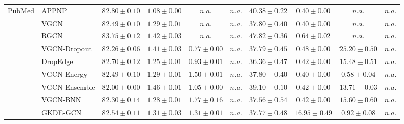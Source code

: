 \begin{table*}[!h]
{\begin{tabular}{ll|cccc|cccc}
        \multirow{10}{*}{PubMed}
        & APPNP & ${82.80\scriptscriptstyle \pm 0.10}$ & ${1.08\scriptscriptstyle \pm 0.00}$ & $n.a.$ & $n.a.$ & ${40.38\scriptscriptstyle \pm 0.22}$ & ${0.40\scriptscriptstyle \pm 0.00}$ & $n.a.$ & $n.a.$\\
        & VGCN & ${82.49\scriptscriptstyle \pm 0.10}$ & ${1.29\scriptscriptstyle \pm 0.01}$ & $n.a.$ & $n.a.$ & ${37.80\scriptscriptstyle \pm 0.40}$ & ${0.40\scriptscriptstyle \pm 0.00}$ & $n.a.$ & $n.a.$\\
        & RGCN & ${\mathbf{83.75}\scriptscriptstyle \pm 0.12}$ & ${1.42\scriptscriptstyle \pm 0.03}$ & $n.a.$ & $n.a.$ & ${47.82\scriptscriptstyle \pm 0.36}$ & ${0.64\scriptscriptstyle \pm 0.02}$ & $n.a.$ & $n.a.$\\
        & VGCN-Dropout & ${82.26\scriptscriptstyle \pm 0.06}$ & ${1.41\scriptscriptstyle \pm 0.03}$ & ${0.77\scriptscriptstyle \pm 0.00}$ & $n.a.$ & ${37.79\scriptscriptstyle \pm 0.45}$ & ${0.48\scriptscriptstyle \pm 0.00}$ & ${25.20\scriptscriptstyle \pm 0.50}$ & $n.a.$\\
        & DropEdge & ${82.70\scriptscriptstyle \pm 0.12}$ & ${1.25\scriptscriptstyle \pm 0.01}$ & ${0.93\scriptscriptstyle \pm 0.01}$ & $n.a.$ & ${36.36\scriptscriptstyle \pm 0.47}$ & ${0.42\scriptscriptstyle \pm 0.00}$ & ${15.48\scriptscriptstyle \pm 0.51}$ & $n.a.$\\
        & VGCN-Energy & ${82.49\scriptscriptstyle \pm 0.10}$ & ${1.29\scriptscriptstyle \pm 0.01}$ & ${1.50\scriptscriptstyle \pm 0.01}$ & $n.a.$ & ${37.80\scriptscriptstyle \pm 0.40}$ & ${0.40\scriptscriptstyle \pm 0.00}$ & ${0.58\scriptscriptstyle \pm 0.04}$ & $n.a.$\\
        & VGCN-Ensemble & ${82.00\scriptscriptstyle \pm 0.00}$ & ${1.46\scriptscriptstyle \pm 0.01}$ & ${1.05\scriptscriptstyle \pm 0.00}$ & $n.a.$ & ${39.10\scriptscriptstyle \pm 0.10}$ & ${0.42\scriptscriptstyle \pm 0.00}$ & ${13.71\scriptscriptstyle \pm 0.03}$ & $n.a.$\\
        & VGCN-BNN & ${82.30\scriptscriptstyle \pm 0.14}$ & ${1.28\scriptscriptstyle \pm 0.01}$ & ${1.77\scriptscriptstyle \pm 0.16}$ & $n.a.$ & ${37.56\scriptscriptstyle \pm 0.54}$ & ${0.42\scriptscriptstyle \pm 0.00}$ & ${15.60\scriptscriptstyle \pm 0.60}$ & $n.a.$\\
        & GKDE-GCN & ${82.54\scriptscriptstyle \pm 0.11}$ & ${1.31\scriptscriptstyle \pm 0.03}$ & ${1.31\scriptscriptstyle \pm 0.01}$ & $n.a.$ & ${37.77\scriptscriptstyle \pm 0.48}$ & ${{16.95}\scriptscriptstyle \pm 0.49}$ & ${0.92\scriptscriptstyle \pm 0.08}$ & $n.a.$\\

\end{tabular}}
\end{table*}
